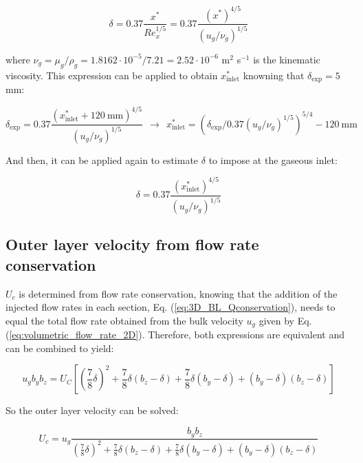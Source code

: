 \begin{equation}
\delta = 0.37 \frac{x^*}{Re_x^{1/5}} = 0.37 \frac{\left( x^* \right)^{4/5}}{\left( u_g/\nu_g \right)^{1/5}}
\end{equation}

where $\nu_g = \mu_g / \rho_g = 1.8162 \cdot 10^{-5}/ 7.21 = 2.52 \cdot 10^{-6}$ m$^2$ s$^{-1}$ is the kinematic viscosity. This expression can be applied to obtain $x^*_\mathrm{inlet}$ knowning that $\delta_\mathrm{exp} = 5 $ mm:

\begin{equation}
\delta_\mathrm{exp} = 0.37 \frac{\left( x^*_\mathrm{inlet} + 120 ~ \mathrm{mm} \right)^{4/5}}{\left( u_g/\nu_g \right)^{1/5}} ~~ \rightarrow ~~ x^*_\mathrm{inlet}  = \left( \delta_\mathrm{exp} / 0.37 \left( u_g/\nu_g \right)^{1/5} \right)^{5/4} - 120 ~ \mathrm{mm}
\end{equation}

And then, it can be applied again to estimate $\delta$ to impose at the gaseous inlet:

\begin{equation}
\label{eq:delta_jicf_gaseous_inlet}
\boxed{
\delta = 0.37 \frac{\left( x^*_\mathrm{inlet} \right)^{4/5}}{\left( u_g/\nu_g \right)^{1/5}}
}
\end{equation}


\subsection*{Outer layer velocity from flow rate conservation}

$U_c$ is determined from flow rate conservation, knowing that the addition of the injected flow rates in each section, Eq. (\ref{eq:3D_BL_Qconservation}), needs to equal the total flow rate obtained from the bulk velocity $u_g$ given by Eq. (\ref{eq:volumetric_flow_rate_2D}). Therefore, both expressions are equivalent and can be combined to yield:

\begin{equation}
u_g b_y b_z = U_C \left[ \left( \frac{7}{8} \delta \right)^2 + \frac{7}{8} \delta \left( b_z - \delta \right) + \frac{7}{8} \delta \left( b_y - \delta \right) + \left( b_y - \delta \right)  \left( b_z - \delta \right) \right]
\end{equation}

So the outer layer velocity can be solved:

\begin{equation}
\label{eq:uc_jicf_gaseous_inlet}
\boxed{
U_c = u_g \frac{b_y b_z}{\left( \frac{7}{8} \delta \right)^2 + \frac{7}{8} \delta \left( b_z - \delta \right) + \frac{7}{8} \delta \left( b_y - \delta \right) + \left( b_y - \delta \right)  \left( b_z - \delta \right)}
}
\end{equation}






